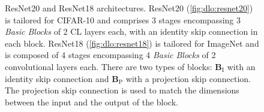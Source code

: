 \begin{figure}
\centering
{}
  \hfill
{}

\caption{ResNet20 and ResNet18 architectures. ResNet20 (\cref{fig:dlo:resnet20})
is tailored for CIFAR-10 and comprises 3 stages encompassing 3 \emph{Basic
Blocks} of 2 \ac{CL} layers each, with an identity skip connection in each
block. ResNet18 (\cref{fig:dlo:resnet18}) is tailored for ImageNet and is
composed of 4 stages encompassing 4 \emph{Basic Blocks} of 2 convolutional
layers each. There are two types of blocks: $\mathbf{B}_\text{I}$ with an
identity skip connection and $\mathbf{B}_\text{P}$ with a projection skip
connection. The projection skip connection is used to match the dimensions
between the input and the output of the block.}
\label{fig:dlo:resnets}
\end{figure}

